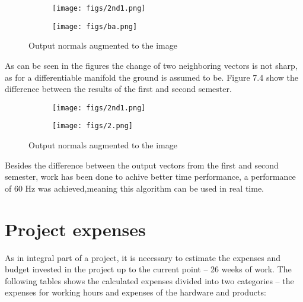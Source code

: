 \documentclass[12pt,a4paper,oneside,onecolumn]{book}
\begin{document}
\begin{figure}[H]
    \centering
    \begin{subfigure}[b]{6cm}
        \texttt{[image: figs/2nd1.png]}
        \caption{}
    \end{subfigure}
    \begin{subfigure}[b]{6cm}
        \texttt{[image: figs/ba.png]}
        \caption{}
    \end{subfigure}

    \caption{Output normals augmented to the image}
\end{figure}
As can be seen in the figures the change of two neighboring vectors is not sharp, as for a differentiable manifold the ground is assumed to be.
Figure 7.4 show the difference between the results of the first and second semester.

\begin{figure}[H]
    \centering
    \begin{subfigure}[b]{6cm}
        \texttt{[image: figs/2nd1.png]}
        \caption{}
    \end{subfigure}
    \begin{subfigure}[b]{6cm}
        \texttt{[image: figs/2.png]}
        \caption{}
    \end{subfigure}

    \caption{Output normals augmented to the image}
\end{figure}

Besides the difference between the output vectors from the first and second semester, work has been done to achive better time performance, a performance of 60 Hz was achieved,meaning this algorithm can be used in real time.    

\chapter{Project expenses}
As in integral part of a project, it is necessary to estimate the expenses and budget
invested in the project up to the current point – 26 weeks of work. The following
tables shows the calculated expenses divided into two categories – the expenses for
working hours and expenses of the hardware and products:
\end{document}
